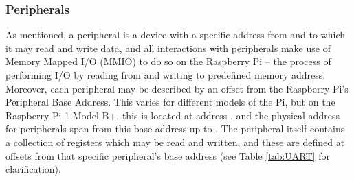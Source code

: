     \subsubsection{Peripherals}
        As mentioned, a peripheral is a device with a specific address from and
        to which it may read and write data, and all interactions with
        peripherals make use of Memory Mapped I/O (MMIO) to do so on the
        Raspberry Pi -- the process of performing I/O by reading from and
        writing to predefined memory address. Moreover, each peripheral may be
        described by an offset from the Raspberry Pi's Peripheral Base Address.
        This varies for different models of the Pi, but on the Raspberry Pi 1
        Model B+, this is located at address , and the physical
        address for peripherals span from this base address up to
        . The peripheral itself contains a collection of
        registers which may be read and written, and these are defined at
        offsets from that specific peripheral's base address (see Table
        \ref{tab:UART} for clarification).

